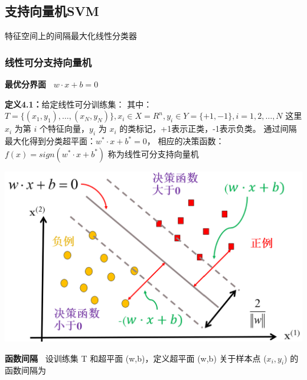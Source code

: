 \documentclass[b4paper, 10pt]{ctexart}
\makeatletter
\newenvironment{figurehere}
{\def\@captype{figure}}
{}
\makeatother
\begin{document}
\begin{multicols}{3}
\subsection{支持向量机SVM}

特征空间上的间隔最大化线性分类器



\subsubsection{线性可分支持向量机}

\textbf{最优分界面\ } $w\cdot x + b = 0$

\textbf{定义4.1：}给定线性可分训练集：
其中：
$T=\{(x_1,y_1),\dots,(x_N,y_N)\},x_i\in X=R^n,y_i\in Y=\{+1,-1\},i=1,2,\dots,N$
这里 $x_i$ 为第 $i$ 个特征向量，$y_i$ 为 $x_i$ 的类标记，+1表示正类，-1表示负类。
通过间隔最大化得到分类超平面：$w^*\cdot x + b^* = 0$，
相应的决策函数：$f(x)=sign(w^*\cdot x + b^*)$
称为线性可分支持向量机

\begin{figurehere}
    \centering    \includegraphics[width=0.99\linewidth]{figs/linerSVM.png}
    \vskip -7pt%
    \label{fig:linerSVM}
\end{figurehere}

\textbf{函数间隔\ } 设训练集 T 和超平面 (w,b)，定义超平面 (w,b) 关于样本点 ($x_i,y_i$) 的函数间隔为


\end{multicols}
\end{document}
